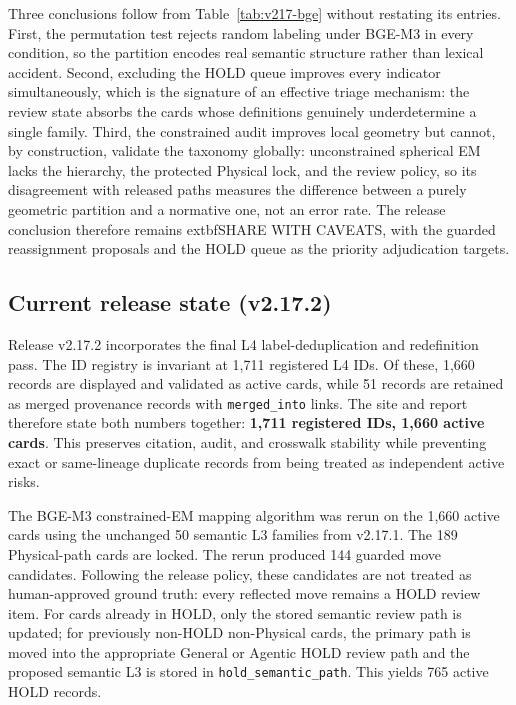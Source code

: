 \documentclass[11pt,a4paper]{article}
\newcommand{\code}[1]{\texttt{#1}}
\begin{document}
Three conclusions follow from Table~\ref{tab:v217-bge} without restating its
entries. First, the permutation test rejects random labeling under BGE-M3 in
every condition, so the partition encodes real semantic structure rather than
lexical accident. Second, excluding the HOLD queue improves every indicator
simultaneously, which is the signature of an effective triage mechanism: the
review state absorbs the cards whose definitions genuinely underdetermine a
single family. Third, the constrained audit improves local geometry but
cannot, by construction, validate the taxonomy globally: unconstrained
spherical EM lacks the hierarchy, the protected Physical lock, and the review
policy, so its disagreement with released paths measures the difference
between a purely geometric partition and a normative one, not an error rate.
The release conclusion therefore remains 	extbf{SHARE WITH CAVEATS}, with
the guarded reassignment proposals and the HOLD queue as the priority
adjudication targets.

\subsection{Current release state (v2.17.2)}

Release v2.17.2 incorporates the final L4 label-deduplication and
redefinition pass. The ID registry is invariant at 1,711 registered L4 IDs.
Of these, 1,660 records are displayed and validated as active cards, while 51
records are retained as merged provenance records with \code{merged\_into}
links. The site and report therefore state both numbers together:
\textbf{1,711 registered IDs, 1,660 active cards}. This preserves citation,
audit, and crosswalk stability while preventing exact or same-lineage duplicate
records from being treated as independent active risks.

The BGE-M3 constrained-EM mapping algorithm was rerun on the 1,660 active
cards using the unchanged 50 semantic L3 families from v2.17.1. The 189
Physical-path cards are locked. The rerun produced 144 guarded move
candidates. Following the release policy, these candidates are not treated as
human-approved ground truth: every reflected move remains a HOLD review item.
For cards already in HOLD, only the stored semantic review path is updated; for
previously non-HOLD non-Physical cards, the primary path is moved into the
appropriate General or Agentic HOLD review path and the proposed semantic L3 is
stored in \code{hold\_semantic\_path}. This yields 765 active HOLD records.
\end{document}
